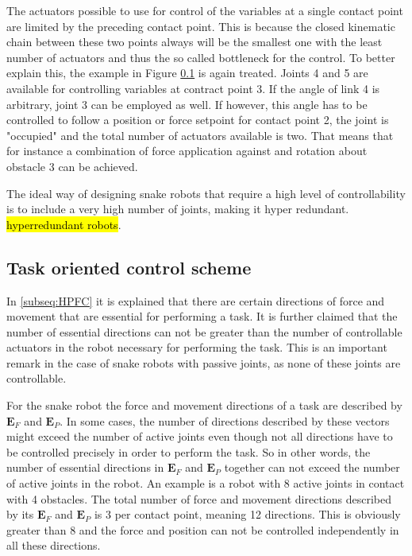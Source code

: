 The actuators possible to use for control of the variables at a single contact point are limited by the preceding contact point. This is because the closed kinematic chain between these two points always will be the smallest one with the least number of actuators and thus the so called bottleneck for the control. To better explain this, the example in Figure \ref{} is again treated. Joints 4 and 5 are available for controlling variables at contract point 3.
If the angle of link 4 is arbitrary, joint 3 can be employed as well. If however, this angle has to be controlled to follow a position or force setpoint for contact point 2, the joint is "occupied" and the total number of actuators available is two. That means that for instance a combination of force application against and rotation about obstacle 3 can be achieved.

The ideal way of designing snake robots that require a high level of controllability is to include a very high number of joints, making it hyper redundant. \hl{hyperredundant robots}.


\subsection{Task oriented control scheme}


In \ref{subseq:HPFC} it is explained that there are certain directions of force and movement that are essential for performing a task. It is further claimed that the number of essential directions can not be greater than the number of controllable actuators in the robot necessary for performing the task. This is an important remark in the case of snake robots with passive joints, as none of these joints are controllable.

For the snake robot the force and movement directions of a task are described by $\mathbf{E}_F$ and $\mathbf{E}_P$. In some cases, the number of directions described by these vectors might exceed the number of active joints even though not all directions have to be controlled precisely in order to perform the task. So in other words, the number of essential directions in $\mathbf{E}_F$ and $\mathbf{E}_P$ together can not exceed the number of active joints in the robot. An example is a robot with 8 active joints in contact with 4 obstacles. The total number of force and movement directions described by its $\mathbf{E}_F$ and $\mathbf{E}_P$ is 3 per contact point, meaning 12 directions. This is obviously greater than 8 and the force and position can not be controlled independently in all these directions.

